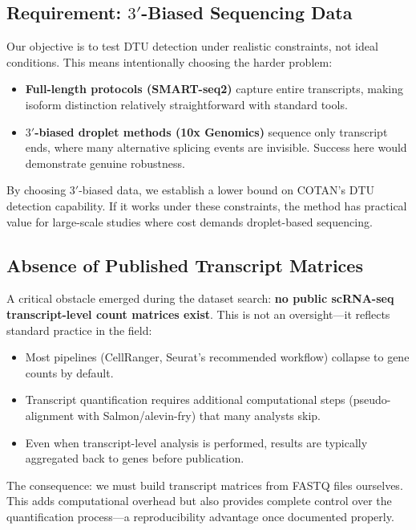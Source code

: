 \subsection*{Requirement: $3'$-Biased Sequencing Data}

Our objective is to test DTU detection under realistic constraints, not ideal conditions. This means intentionally choosing the harder problem:
\begin{itemize}
    \item \textbf{Full-length protocols (SMART-seq2)} capture entire transcripts, making isoform distinction relatively straightforward with standard tools.
    \item \textbf{$3'$-biased droplet methods (10x Genomics)} sequence only transcript ends, where many alternative splicing events are invisible. Success here would demonstrate genuine robustness.
\end{itemize}

By choosing $3'$-biased data, we establish a lower bound on COTAN's DTU detection capability. If it works under these constraints, the method has practical value for large-scale studies where cost demands droplet-based sequencing.

\subsection*{Absence of Published Transcript Matrices}

A critical obstacle emerged during the dataset search: \textbf{no public scRNA-seq transcript-level count matrices exist}. This is not an oversight---it reflects standard practice in the field:
\begin{itemize}
    \item Most pipelines (CellRanger, Seurat's recommended workflow) collapse to gene counts by default.
    \item Transcript quantification requires additional computational steps (pseudo-alignment with Salmon/alevin-fry) that many analysts skip.
    \item Even when transcript-level analysis is performed, results are typically aggregated back to genes before publication.
\end{itemize}

The consequence: we must build transcript matrices from FASTQ files ourselves. This adds computational overhead but also provides complete control over the quantification process---a reproducibility advantage once documented properly.

